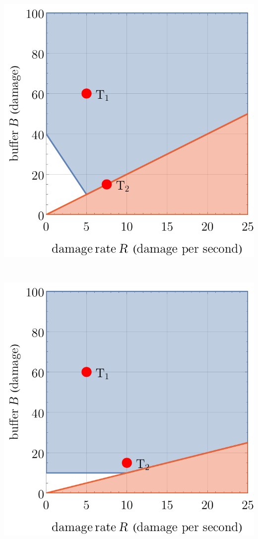 \begin{center}
\begin{minipage}{.33\textwidth}
    \end{minipage}%
    \begin{minipage}{.33\textwidth}
        \centering
        \includegraphics[width=0.95\linewidth]{img/model3 g2.pdf}
        \label{fig:model3-g2}
    \end{minipage}\\
    \begin{minipage}{.33\textwidth}
        \centering
        \includegraphics[width=0.95\linewidth]{img/model3 n1.pdf}

\end{minipage}
\end{center}
